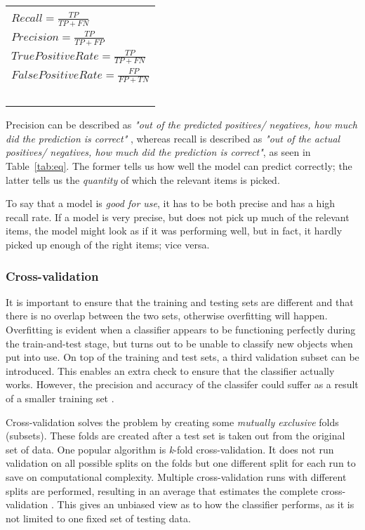 \documentclass[lit_review.tex]{subfiles}
\begin{document}
\parbox{\linewidth} {
  \centering
  \begin{tabular}{|l|}
    \hline \\
    \( Recall              = \frac{TP}{TP + FN} \) \\[10pt]
    \( Precision           = \frac{TP}{TP + FP} \) \\[10pt]
    \( True Positive Rate  = \frac{TP}{TP + FN} \) \\[10pt]
    \( False Positive Rate = \frac{FP}{FP + TN} \) \\~\\
    \hline
  \end{tabular}
  
  \label{tab:eq}
}

Precision can be described as \textit{"out of the predicted positives/ negatives, how much did the prediction is correct" }, whereas recall is described as \textit{"out of the actual positives/ negatives, how much did the prediction is correct"}, as seen in Table~\ref{tab:eq}. The former tells us how well the model can predict correctly; the latter tells us the \textit{quantity} of which the relevant items is picked.~\cite{precision-recall-wiki}

To say that a model is \textit{good for use}, it has to be both precise and has a high recall rate. If a model is very precise, but does not pick up much of the relevant items, the model might look as if it was performing well, but in fact, it hardly picked up enough of the right items; vice versa.

\subsubsection{Cross-validation}
It is important to ensure that the training and testing sets are different and that there is no overlap between the two sets, otherwise overfitting will happen. Overfitting is evident when a classifier appears to be functioning perfectly during the train-and-test stage, but turns out to be unable to classify new objects when put into use. On top of the training and test sets, a third validation subset can be introduced. This enables an extra check to ensure that the classifier actually works.  However, the precision and accuracy of the classifer could suffer as a result of a smaller training set \cite{cross-val-scikit}. 

Cross-validation solves the problem by creating some \textit{mutually exclusive} folds (subsets). These folds are created after a test set is taken out from the original set of data. One popular algorithm is \textit{k}-fold cross-validation. It does not run validation on all possible splits on the folds but one different split for each run to save on computational complexity. Multiple cross-validation runs with different splits are performed, resulting in an average that estimates the complete cross-validation \cite{cross-val-kohavi}. This gives an unbiased view as to how the classifier performs, as it is not limited to one fixed set of testing data.
\end{document}
